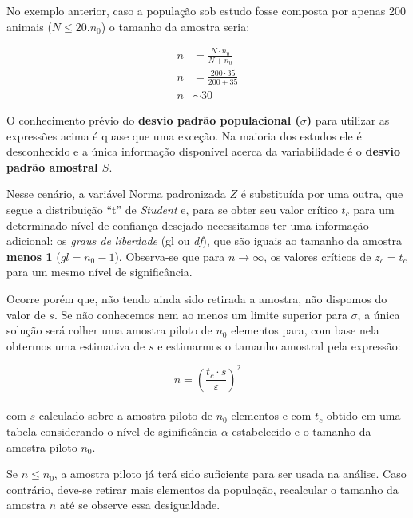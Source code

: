\documentclass[
]{book}
\begin{document}
No exemplo anterior, caso a população sob estudo fosse composta por apenas 200 animais (\(N \le 20.n_{0}\)) o tamanho da amostra seria:

\hfill\break

\begin{align*}
n & = \frac{N \cdot n_{0}}{N + n_{0}} \\
n & = \frac{200 \cdot 35}{200  + 35 } \\
n & \sim 30
\end{align*}

\hfill\break

O conhecimento prévio do \textbf{desvio padrão populacional (\(\sigma\))} para utilizar as expressões acima é quase que uma exceção. Na maioria dos estudos ele é desconhecido e a única informação disponível acerca da variabilidade é o \textbf{desvio padrão amostral \(S\)}.

\hfill\break

Nesse cenário, a variável Norma padronizada \(Z\) é substituída por uma outra, que segue a distribuição ``t'' de \emph{Student} e, para se obter seu valor crítico \(t_{c}\) para um determinado nível de confiança desejado necessitamos ter uma informação adicional: os \emph{graus de liberdade} (gl ou \emph{df}), que são iguais ao tamanho da amostra \textbf{menos 1} (\(gl=n_{0}-1\)). Observa-se que para \(n \to \infty\), os valores críticos de \(z_{c}=t_{c}\) para um mesmo nível de significância.

\hfill\break

Ocorre porém que, não tendo ainda sido retirada a amostra, não dispomos do valor de \(s\). Se não conhecemos nem ao menos um limite superior para \(\sigma\), a única solução será colher uma amostra piloto de \(n_0\) elementos para, com base nela obtermos uma estimativa de \(s\) e estimarmos o tamanho amostral pela expressão:

\[
n = \left( \frac{t_{c} \cdot s}{\varepsilon} \right)^{2}
\]\\

com \(s\) calculado sobre a amostra piloto de \(n_{0}\) elementos e com \(t_{c}\) obtido em uma tabela considerando o nível de sginificância \(\alpha\) estabelecido e o tamanho da amostra piloto \(n_{0}\).

\hfill\break

Se \(n \le n_{0}\), a amostra piloto já terá sido suficiente para ser usada na análise. Caso contrário, deve-se retirar mais elementos da população, recalcular o tamanho da amostra \(n\) até se observe essa desigualdade.
\end{document}

